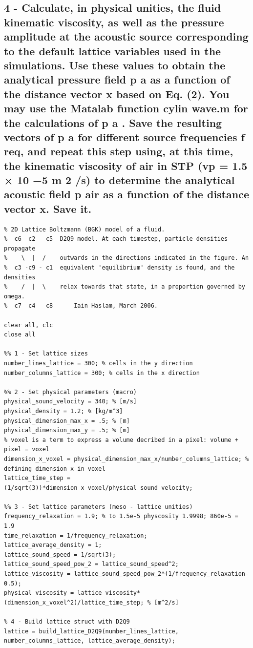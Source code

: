 \subsection{4 - Calculate, in physical unities, the fluid kinematic viscosity, as well as the pressure amplitude at the
acoustic source corresponding to the default lattice variables used in the simulations. Use these values
to obtain the analytical pressure field p a as a function of the distance vector x based on Eq. (2). You
may use the Matalab function cylin wave.m for the calculations of p a . Save the resulting vectors of p a
for different source frequencies f req, and repeat this step using, at this time, the kinematic viscosity of
air in STP (vp = 1.5 × 10 −5 m 2 /s) to determine the analytical acoustic field p air as a function of the
distance vector x. Save it.}
\begin{lstlisting}
% 2D Lattice Boltzmann (BGK) model of a fluid.
%  c6  c2   c5  D2Q9 model. At each timestep, particle densities propagate
%    \  |  /    outwards in the directions indicated in the figure. An
%  c3 -c9 - c1  equivalent 'equilibrium' density is found, and the densities
%    /  |  \    relax towards that state, in a proportion governed by omega.
%  c7  c4   c8      Iain Haslam, March 2006.

clear all, clc
close all

%% 1 - Set lattice sizes
number_lines_lattice = 300; % cells in the y direction
number_columns_lattice = 300; % cells in the x direction

%% 2 - Set physical parameters (macro)
physical_sound_velocity = 340; % [m/s]
physical_density = 1.2; % [kg/m^3]
physical_dimension_max_x = .5; % [m]
physical_dimension_max_y = .5; % [m]
% voxel is a term to express a volume decribed in a pixel: volume + pixel = voxel
dimension_x_voxel = physical_dimension_max_x/number_columns_lattice; % defining dimension x in voxel
lattice_time_step = (1/sqrt(3))*dimension_x_voxel/physical_sound_velocity;

%% 3 - Set lattice parameters (meso - lattice unities)
frequency_relaxation = 1.9; % to 1.5e-5 physcosity 1.9998; 860e-5 = 1.9
time_relaxation = 1/frequency_relaxation;
lattice_average_density = 1;
lattice_sound_speed = 1/sqrt(3);
lattice_sound_speed_pow_2 = lattice_sound_speed^2;
lattice_viscosity = lattice_sound_speed_pow_2*(1/frequency_relaxation-0.5);
physical_viscosity = lattice_viscosity*(dimension_x_voxel^2)/lattice_time_step; % [m^2/s]

% 4 - Build lattice struct with D2Q9
lattice = build_lattice_D2Q9(number_lines_lattice, number_columns_lattice, lattice_average_density);


\end{lstlisting}

